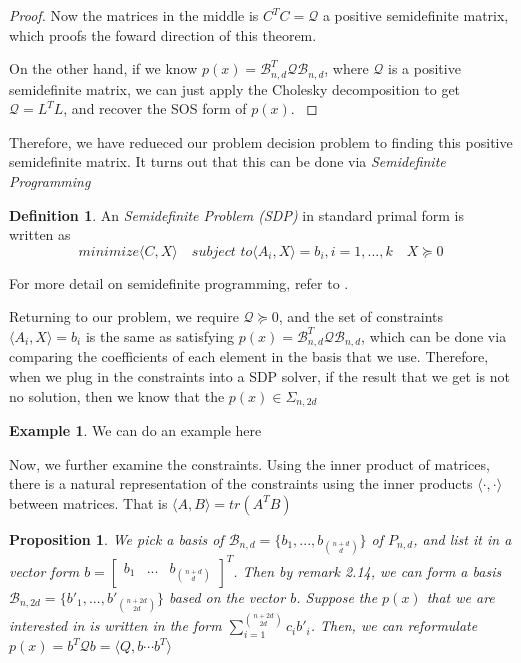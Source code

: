 \documentclass[12pt]{amsart}
\numberwithin{equation}{section}
\newtheorem{prop}[thm]{Proposition}
\theoremstyle{definition}
\newtheorem{definition}[thm]{Definition}
\newtheorem{example}[thm]{Example}
\numberwithin{thm}{section}
\begin{document}
\begin{proof}
     Now the matrices in the middle is $C^T C = \mathcal{Q}$ a positive semidefinite matrix, which proofs the foward direction of this theorem.

     On the other hand, if we know $p(x) = \mathcal{B}_{n, d}^T \mathcal{Q} \mathcal{B}_{n, d}$, where $\mathcal{Q}$ is a positive semidefinite matrix, we can just apply the Cholesky decomposition to get $\mathcal{Q} = L^T L$, and recover the SOS form of $p(x)$. \cite{Blekherman:Parrilo:Thomas}
\end{proof}

\smallskip
Therefore, we have redueced our problem decision problem to finding this positive semidefinite matrix. It turns out that this can be done via \emph{Semidefinite Programming} \cite{Blekherman:Parrilo:Thomas}
\begin{definition}
     \label{def:SDP}
     An \emph{Semidefinite Problem (SDP)} in standard primal form is written as
     \begin{equation}
          \textit{minimize} \langle C, X \rangle \quad \textit{subject to} \langle A_i, X \rangle = b_i, i=1,...,k \quad X \succcurlyeq 0
     \end{equation}
\end{definition}
For more detail on semidefinite programming, refer to \cite{Blekherman:Parrilo:Thomas}.

Returning to our problem, we require $\mathcal{Q} \succcurlyeq 0$, and the set of constraints $ \langle A_i, X \rangle = b_i$ is the same as satisfying $p(x) = \mathcal{B}_{n, d}^T \mathcal{Q} \mathcal{B}_{n, d}$, which can be done via comparing the coefficients of each element in the basis that we use. \cite{Recher:Masterthesis} 
Therefore, when we plug in the constraints into a SDP solver, if the result that we get is not no solution, then we know that the $p(x) \in \Sigma_{n, 2d}$

\begin{example}
     We can do an example here
\end{example}

\smallskip
Now, we further examine the constraints. Using the inner product of matrices, there is a natural representation of the constraints using the inner products $\langle \cdot,  \cdot \rangle$ between matrices. That is $\langle A, B \rangle = tr(A^T B)$ 

\begin{prop}

     We pick a basis of $\mathcal{B}_{n, d} = \{b_1, ..., b_{n + d \choose d}\}$ of $P_{n, d}$, and list it in a vector form $ b =\begin{bmatrix}
          b_1 &
          ... &
          b_{ n+ d \choose d}
     \end{bmatrix} ^ T$. Then by remark 2.14, we can form a basis $\mathcal{B}_{n, 2d} = \{b'_1, ..., b'_{n + 2d \choose 2d}\}$ based on the vector $b$. 
     Suppose the $p(x)$ that we are interested in is written in the form $\sum_{i = 1}^{n + 2d \choose 2d } c_i b'_i$.
     Then, we can reformulate $p(x) = b^T \mathcal{Q} b = \langle Q, b \cdots b^T \rangle$ 
\end{prop}
\end{document}
